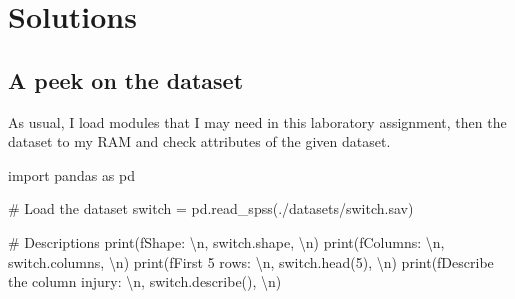 \documentclass[
  a4paper,
  DIV=11,
  numbers=noendperiod]{scrartcl}
\newenvironment{Shaded}{\begin{snugshade}}{\end{snugshade}}
\newcommand{\BuiltInTok}[1]{\textcolor[rgb]{0.00,0.23,0.31}{#1}}
\newcommand{\CharTok}[1]{\textcolor[rgb]{0.13,0.47,0.30}{#1}}
\newcommand{\CommentTok}[1]{\textcolor[rgb]{0.37,0.37,0.37}{#1}}
\newcommand{\DecValTok}[1]{\textcolor[rgb]{0.68,0.00,0.00}{#1}}
\newcommand{\ImportTok}[1]{\textcolor[rgb]{0.00,0.46,0.62}{#1}}
\newcommand{\NormalTok}[1]{\textcolor[rgb]{0.00,0.23,0.31}{#1}}
\newcommand{\OperatorTok}[1]{\textcolor[rgb]{0.37,0.37,0.37}{#1}}
\newcommand{\SpecialStringTok}[1]{\textcolor[rgb]{0.13,0.47,0.30}{#1}}
\newcommand{\StringTok}[1]{\textcolor[rgb]{0.13,0.47,0.30}{#1}}
\begin{document}
\section{Solutions}\label{solutions}

\subsection{A peek on the dataset}\label{a-peek-on-the-dataset}

As usual, I load modules that I may need in this laboratory assignment,
then the dataset to my RAM and check attributes of the given dataset.

\begin{Shaded}
\begin{Highlighting}[numbers=left,,]
\ImportTok{import}\NormalTok{ pandas }\ImportTok{as}\NormalTok{ pd}

\CommentTok{\# Load the dataset}
\NormalTok{switch }\OperatorTok{=}\NormalTok{ pd.read\_spss(}\StringTok{\textquotesingle{}./datasets/switch.sav\textquotesingle{}}\NormalTok{)}
\end{Highlighting}
\end{Shaded}

\begin{Shaded}
\begin{Highlighting}[numbers=left,,]
\CommentTok{\# Descriptions}
\BuiltInTok{print}\NormalTok{(}\SpecialStringTok{f\textquotesingle{}Shape: }\CharTok{\textbackslash{}n}\SpecialStringTok{\textquotesingle{}}\NormalTok{, switch.shape, }\StringTok{\textquotesingle{}}\CharTok{\textbackslash{}n}\StringTok{\textquotesingle{}}\NormalTok{)}
\BuiltInTok{print}\NormalTok{(}\SpecialStringTok{f\textquotesingle{}Columns: }\CharTok{\textbackslash{}n}\SpecialStringTok{\textquotesingle{}}\NormalTok{, switch.columns, }\StringTok{\textquotesingle{}}\CharTok{\textbackslash{}n}\StringTok{\textquotesingle{}}\NormalTok{)}
\BuiltInTok{print}\NormalTok{(}\SpecialStringTok{f\textquotesingle{}First 5 rows: }\CharTok{\textbackslash{}n}\SpecialStringTok{\textquotesingle{}}\NormalTok{, switch.head(}\DecValTok{5}\NormalTok{), }\StringTok{\textquotesingle{}}\CharTok{\textbackslash{}n}\StringTok{\textquotesingle{}}\NormalTok{)}
\BuiltInTok{print}\NormalTok{(}\SpecialStringTok{f\textquotesingle{}Describe the column \textasciigrave{}injury\textasciigrave{}: }\CharTok{\textbackslash{}n}\SpecialStringTok{\textquotesingle{}}\NormalTok{, switch.describe(), }\StringTok{\textquotesingle{}}\CharTok{\textbackslash{}n}\StringTok{\textquotesingle{}}\NormalTok{)}
\end{Highlighting}
\end{Shaded}
\end{document}
